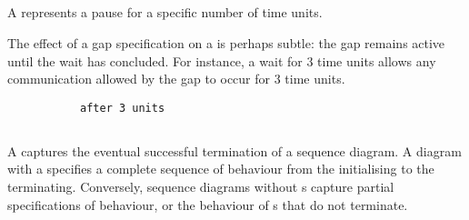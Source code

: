 \subsection{\mwaitaction}\label{ssec:metamodel-actions-waits}

A \mwaitaction{} represents a pause for a specific number of time
units.

\begin{remark}
  The effect of a gap specification on a \mwaitaction{} is perhaps
  subtle: the gap remains active until the wait has concluded.  For
  instance, a wait for \(3\) time units allows any communication
  allowed by the gap to occur for \(3\) time units.
\end{remark} 

\begin{figure}[H]
\begin{subfigure}[t]{\egtextwidth}
\begin{lstlisting}[style=Example]
after 3 units
\end{lstlisting}
\end{subfigure}
\hfill
\begin{subfigure}[t]{\eggraphicalwidth}
\gsecaption
\centering
{}
\end{subfigure}

\end{figure}

\subsection{\mfinalaction}\label{ssec:metamodel-actions-final}

A \mfinalaction{} captures the eventual successful termination of a
sequence diagram.  A diagram with a \mfinalaction{} specifies a
complete sequence of behaviour from the \mtarget{} initialising to the
\mtarget{} terminating.  Conversely, sequence diagrams without
\mfinalaction s capture partial specifications of behaviour, or the
behaviour of \mtarget s that do not terminate.

